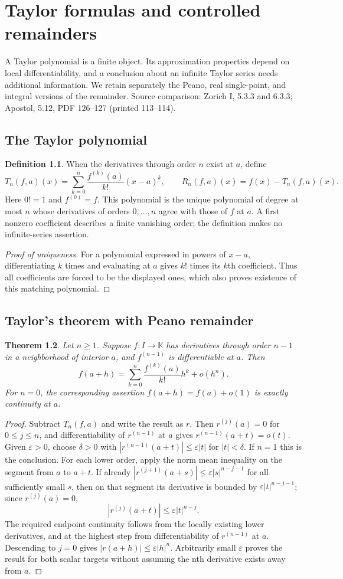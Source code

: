 \documentclass[11pt,oneside,a4paper]{book}
\newtheorem{theorem}{Theorem}[chapter]
\theoremstyle{definition}
\newtheorem{definition}[theorem]{Definition}
\theoremstyle{remark}
\newcommand{\K}{\mathbb K}
\newcommand{\eps}{\varepsilon}
\newcommand{\KEntry}[2]{\Needspace{7\baselineskip}\section{#2}\label{#1}{\small\sffamily\color{black!60}\detokenize{#1}}\par}
\newcommand{\SourceRef}[1]{{\small\textsf{Source comparison: #1.}}}
\begin{document}
\chapter{Taylor formulas and controlled remainders}
A Taylor polynomial is a finite object. Its approximation properties depend on local differentiability, and a conclusion about an infinite Taylor series needs additional information. We retain separately the Peano, real single-point, and integral versions of the remainder.
\SourceRef{Zorich I, 5.3.3 and 6.3.3; Apostol, 5.12, PDF 126--127 (printed 113--114)}

\KEntry{K03.06.taylor_polynomial}{The Taylor polynomial}
\begin{definition}
When the derivatives through order $n$ exist at $a$, define
\[ T_n(f,a)(x)=\sum_{k=0}^n\frac{f^{(k)}(a)}{k!}(x-a)^k,\qquad R_n(f,a)(x)=f(x)-T_n(f,a)(x). \]
Here $0!=1$ and $f^{(0)}=f$. This polynomial is the unique polynomial of degree at most $n$ whose derivatives of orders $0,\ldots,n$ agree with those of $f$ at $a$. A first nonzero coefficient describes a finite vanishing order; the definition makes no infinite-series assertion.
\end{definition}
\begin{proof}[Proof of uniqueness]
For a polynomial expressed in powers of $x-a$, differentiating $k$ times and evaluating at $a$ gives $k!$ times its $k$th coefficient. Thus all coefficients are forced to be the displayed ones, which also proves existence of this matching polynomial.
\end{proof}

\KEntry{K03.06.peano}{Taylor's theorem with Peano remainder}
\begin{theorem}
Let $n\ge1$. Suppose $f:I\to\K$ has derivatives through order $n-1$ in a neighborhood of interior $a$, and $f^{(n-1)}$ is differentiable at $a$. Then
\[ f(a+h)=\sum_{k=0}^n\frac{f^{(k)}(a)}{k!}h^k+o(h^n). \]
For $n=0$, the corresponding assertion $f(a+h)=f(a)+o(1)$ is exactly continuity at $a$.
\end{theorem}
\begin{proof}
Subtract $T_n(f,a)$ and write the result as $r$. Then $r^{(j)}(a)=0$ for $0\le j\le n$, and differentiability of $r^{(n-1)}$ at $a$ gives $r^{(n-1)}(a+t)=o(t)$. Given $\eps>0$, choose $\delta>0$ with $|r^{(n-1)}(a+t)|\le\eps|t|$ for $|t|<\delta$. If $n=1$ this is the conclusion. For each lower order, apply the norm mean inequality on the segment from $a$ to $a+t$. If already $|r^{(j+1)}(a+s)|\le\eps|s|^{n-j-1}$ for all sufficiently small $s$, then on that segment its derivative is bounded by $\eps|t|^{n-j-1}$; since $r^{(j)}(a)=0$,
\[ |r^{(j)}(a+t)|\le\eps|t|^{n-j}. \]
The required endpoint continuity follows from the locally existing lower derivatives, and at the highest step from differentiability of $r^{(n-1)}$ at $a$. Descending to $j=0$ gives $|r(a+h)|\le\eps|h|^n$. Arbitrarily small $\eps$ proves the result for both scalar targets without assuming the nth derivative exists away from $a$.
\end{proof}
\end{document}
